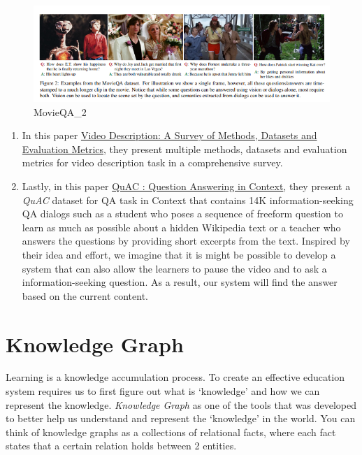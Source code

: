 \documentclass[]{book}
\theoremstyle{definition}
\theoremstyle{definition}
\theoremstyle{definition}
\theoremstyle{remark}
\begin{document}
\begin{figure}
\centering
\includegraphics{img/movieqa2.png}
\caption{MovieQA\_2}
\end{figure}

\begin{enumerate}
\def\labelenumi{\arabic{enumi}.}
\setcounter{enumi}{4}
\item
  In this paper \href{https://arxiv.org/pdf/1806.00186.pdf}{Video
  Description: A Survey of Methods, Datasets and Evaluation Metrics},
  they present multiple methods, datasets and evaluation metrics for
  video description task in a comprehensive survey.
\item
  Lastly, in this paper \href{https://arxiv.org/pdf/1808.07036.pdf}{QuAC
  : Question Answering in Context}, they present a \emph{QuAC} dataset
  for QA task in Context that contains 14K information-seeking QA
  dialogs such as a student who poses a sequence of freeform question to
  learn as much as possible about a hidden Wikipedia text or a teacher
  who answers the questions by providing short excerpts from the text.
  Inspired by their idea and effort, we imagine that it is might be
  possible to develop a system that can also allow the learners to pause
  the video and to ask a information-seeking question. As a result, our
  system will find the answer based on the current content.
\end{enumerate}

\section{Knowledge Graph}\label{knowledge-graph}

Learning is a knowledge accumulation process. To create an effective
education system requires us to first figure out what is `knowledge' and
how we can represent the knowledge. \emph{Knowledge Graph} as one of the
tools that was developed to better help us understand and represent the
`knowledge' in the world. You can think of knowledge graphs as a
collections of relational facts, where each fact states that a certain
relation holds between 2 entities.
\end{document}
